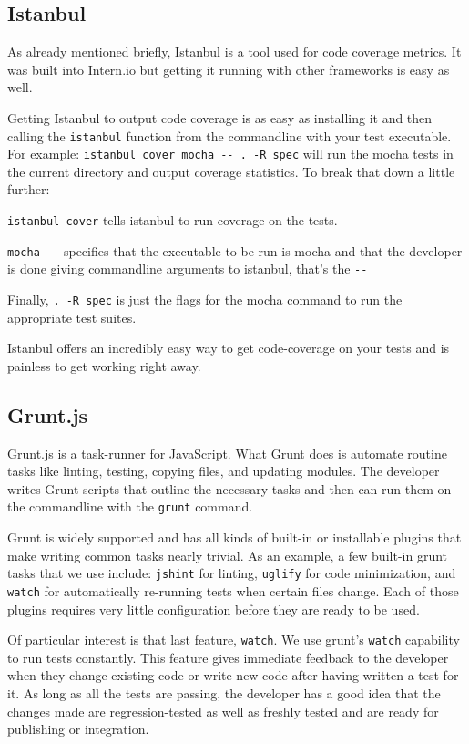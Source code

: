 \documentclass[12pt]{ucthesis}
\begin{document}
\subsection{Istanbul}
As already mentioned briefly, Istanbul\cite{Istanbul} is a tool used for code coverage metrics. It was built into Intern.io but getting it running with other frameworks is easy as well.

Getting Istanbul to output code coverage is as easy as installing it and then calling the \lstinline{istanbul} function from the commandline with your test executable.
For example: \lstinline{istanbul cover mocha -- . -R spec} will run the mocha tests in the current directory and output coverage statistics. To break that down a little further:

\lstinline{istanbul cover} tells istanbul to run coverage on the tests.

\lstinline{mocha --} specifies that the executable to be run is mocha and that the developer is done giving commandline arguments to istanbul, that's the \lstinline{--}

Finally, \lstinline{. -R spec} is just the flags for the mocha command to run the appropriate test suites.

Istanbul offers an incredibly easy way to get code-coverage on your tests and is painless to get working right away.

\subsection{Grunt.js}
Grunt.js\cite{GruntJS} is a task-runner for JavaScript. What Grunt does is automate routine tasks like linting, testing, copying files, and updating modules. The developer writes Grunt scripts that outline the necessary tasks and then can run them on the commandline with the \lstinline{grunt} command.

Grunt is widely supported and has all kinds of built-in or installable plugins that make writing common tasks nearly trivial. As an example, a few built-in grunt tasks that we use include: \lstinline{jshint} for linting, \lstinline{uglify} for code minimization, and \lstinline{watch} for automatically re-running tests when certain files change. Each of those plugins requires very little configuration before they are ready to be used.

Of particular interest is that last feature, \lstinline{watch}. We use grunt's \lstinline{watch} capability to run tests constantly. This feature gives immediate feedback to the developer when they change existing code or write new code after having written a test for it. As long as all the tests are passing, the developer has a good idea that the changes made are regression-tested as well as freshly tested and are ready for publishing or integration.
\end{document}
